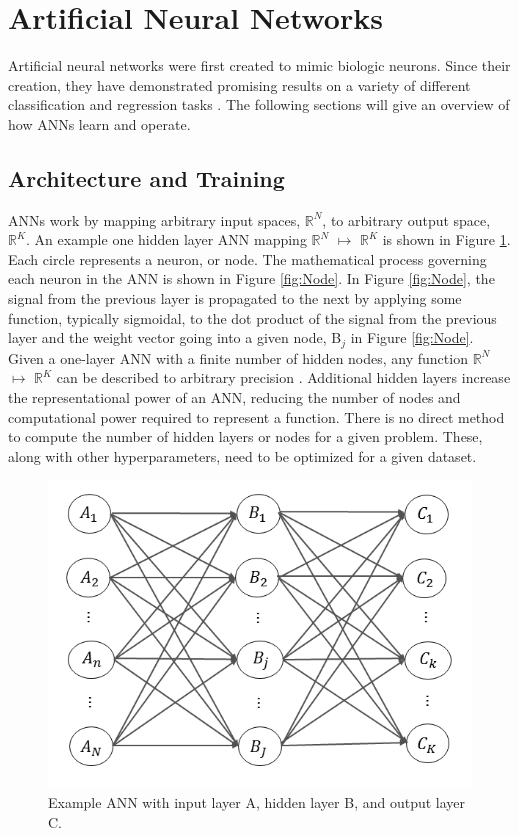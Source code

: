 \documentclass[tocnosub,noragright,centerchapter,12pt,fullpage]{uiucecethesis09}
\begin{document}
\section{Artificial Neural Networks}

Artificial neural networks were first created to mimic biologic neurons. Since their creation, they have demonstrated promising results on a variety of different classification and regression tasks \cite{Jeyanthia2015, Krizhevsky2012, Rababaah2015}. The following sections will give an overview of how ANNs learn and operate.


\subsection{Architecture and Training}

ANNs work by mapping arbitrary input spaces, $\mathbb{R}^N$, to arbitrary output space, $\mathbb{R}^K$. An example one hidden layer ANN mapping $\mathbb{R}^N$ $\mapsto$ $\mathbb{R}^K$ is shown in Figure \ref{fig:Network}. Each circle represents a neuron, or node. The mathematical process governing each neuron in the ANN is shown in Figure \ref{fig:Node}. In Figure \ref{fig:Node}, the signal from the previous layer is propagated to the next by applying some function, typically sigmoidal, to the dot product of the signal from the previous layer and the weight vector going into a given node, B$_{j}$ in Figure \ref{fig:Node}. Given a one-layer ANN with a finite number of hidden nodes, any function $\mathbb{R}^N$ $\mapsto$ $\mathbb{R}^K$ can be described to arbitrary precision \cite{hornik1991}. Additional hidden layers increase the representational power of an ANN, reducing the number of nodes and computational power required to represent a function. There is no direct method to compute the number of hidden layers or nodes for a given problem. These, along with other hyperparameters, need to be optimized for a given dataset.

\begin{figure}
    \centering
    \includegraphics[width=0.5\linewidth]{images/Network}
    \caption{Example ANN with input layer A, hidden layer B, and output layer C.}
    \label{fig:Network}
\end{figure}
\end{document}

